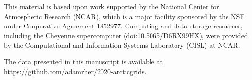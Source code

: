 \documentclass[draft]{agujournal2019}
\begin{document}
%
%
%
%
%
%
%
%


\acknowledgments
This material is based upon work supported by the National Center for Atmospheric Research (NCAR), which is a major facility sponsored by the NSF under Cooperative Agreement 1852977. Computing and data storage resources, including the Cheyenne supercomputer
(doi:10.5065/D6RX99HX), were provided by the Computational and Information Systems Laboratory (CISL) at NCAR.

The data presented in this manuscript is available at {\url{https://github.com/adamrher/2020-arcticgrids}}.




%
%

%



%
%
%
%
%
\end{document}
